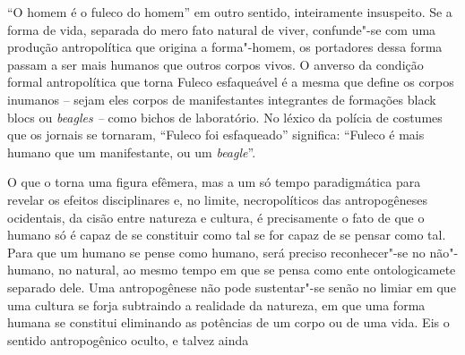 ``O homem é o fuleco do homem'' em outro sentido, inteiramente
insuspeito. Se a forma de vida, separada do mero fato natural de viver,
confunde"-se com uma produção antropolítica que origina a forma"-homem, os
portadores dessa forma passam a ser mais humanos que outros corpos
vivos. O anverso da condição formal antropolítica que torna Fuleco
esfaqueável é a mesma que define os corpos inumanos -- sejam eles corpos
de manifestantes integrantes de formações black blocs ou \emph{beagles
--} como bichos de laboratório. No léxico da polícia de costumes que os
jornais se tornaram, ``Fuleco foi esfaqueado'' significa: ``Fuleco é
mais humano que um manifestante, ou um \emph{beagle}''.

O que o torna uma figura efêmera, mas a um só tempo paradigmática para
revelar os efeitos disciplinares e, no limite, necropolíticos das
antropogêneses ocidentais, da cisão entre natureza e cultura, é
precisamente o fato de que o humano só é capaz de se constituir como tal
se for capaz de se pensar como tal. Para que um humano se pense como
humano, será preciso reconhecer"-se no não"-humano, no natural, ao mesmo
tempo em que se pensa como ente ontologicamete separado dele. Uma
antropogênese não pode sustentar"-se senão no limiar em que uma cultura
se forja subtraindo a realidade da natureza, em que uma forma humana se
constitui eliminando as potências de um corpo ou de uma vida. Eis o
sentido antropogênico oculto, e talvez ainda
